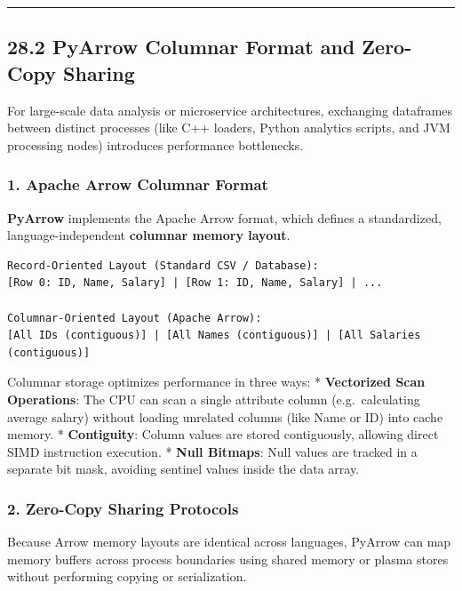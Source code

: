 \begin{center}\rule{0.5\linewidth}{0.5pt}\end{center}

\hypertarget{pyarrow-columnar-format-and-zero-copy-sharing}{%
\subsection{28.2 PyArrow Columnar Format and Zero-Copy
Sharing}\label{pyarrow-columnar-format-and-zero-copy-sharing}}

For large-scale data analysis or microservice architectures, exchanging
dataframes between distinct processes (like C++ loaders, Python
analytics scripts, and JVM processing nodes) introduces performance
bottlenecks.

\hypertarget{apache-arrow-columnar-format}{%
\subsubsection{1. Apache Arrow Columnar
Format}\label{apache-arrow-columnar-format}}

\textbf{PyArrow} implements the Apache Arrow format, which defines a
standardized, language-independent \textbf{columnar memory layout}.

\begin{lstlisting}
Record-Oriented Layout (Standard CSV / Database):
[Row 0: ID, Name, Salary] | [Row 1: ID, Name, Salary] | ...

Columnar-Oriented Layout (Apache Arrow):
[All IDs (contiguous)] | [All Names (contiguous)] | [All Salaries (contiguous)]
\end{lstlisting}

Columnar storage optimizes performance in three ways: *
\textbf{Vectorized Scan Operations}: The CPU can scan a single attribute
column (e.g.~calculating average salary) without loading unrelated
columns (like Name or ID) into cache memory. * \textbf{Contiguity}:
Column values are stored contiguously, allowing direct SIMD instruction
execution. * \textbf{Null Bitmaps}: Null values are tracked in a
separate bit mask, avoiding sentinel values inside the data array.

\hypertarget{zero-copy-sharing-protocols}{%
\subsubsection{2. Zero-Copy Sharing
Protocols}\label{zero-copy-sharing-protocols}}

Because Arrow memory layouts are identical across languages, PyArrow can
map memory buffers across process boundaries using shared memory or
plasma stores without performing copying or serialization.

